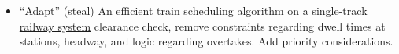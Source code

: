 \documentclass{article}
\begin{document}
    \begin{itemize}
     \item ``Adapt'' (steal) \href{https://link.springer.com/content/pdf/10.1007\%2Fs10951-018-0558-0.pdf}{An efficient train scheduling algorithm on a single-track railway system} clearance check, remove constraints regarding dwell times at stations, headway, and logic regarding overtakes. Add priority considerations.
    \end{itemize}
\end{document}
